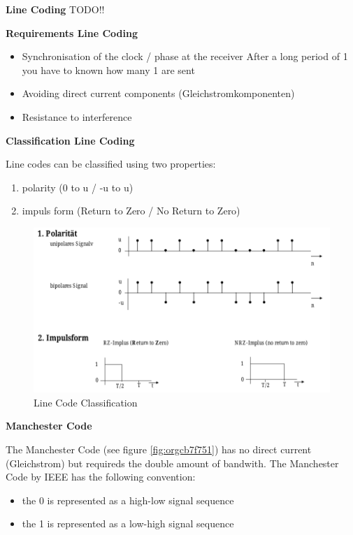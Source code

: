 \documentclass[11pt,twoside,twocolumn,landscape]{article}
\begin{document}
\textbf{Line Coding}
TODO!!

\textbf{Requirements Line Coding}

\begin{itemize}
\item Synchronisation of the clock / phase at the receiver
After a long period of 1 you have to known how many 1 are sent
\item Avoiding direct current components (Gleichstromkomponenten)
\item Resistance to interference
\end{itemize}


\textbf{Classification Line Coding}

Line codes can be classified using two properties:
\begin{enumerate}
\item polarity (0 to u / -u to u)
\item impuls form (Return to Zero / No Return to Zero)
\end{enumerate}


\begin{figure}[htbp]
\centering
\includegraphics[width=.9\linewidth]{img/line_code_classification.png}
\caption{Line Code Classification}
\end{figure}

\textbf{Manchester Code}

The Manchester Code (see figure \ref{fig:orgcb7f751}) has no direct current (Gleichstrom) but requireds the double amount of bandwith.
The Manchester Code by IEEE has the following convention:
\begin{itemize}
\item the 0 is represented as a high-low signal sequence
\item the 1 is represented as a low-high signal sequence
\end{itemize}
\end{document}
